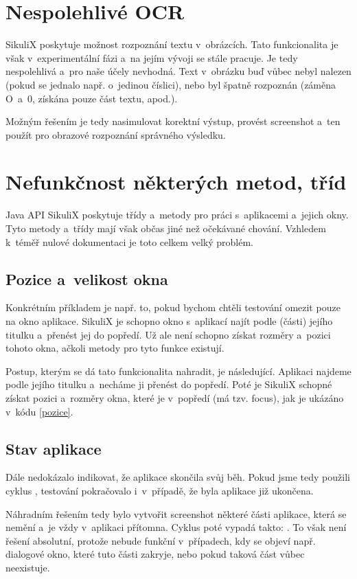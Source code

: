 	\section{Nespolehlivé OCR}
	SikuliX poskytuje možnost rozpoznání textu v~obrázcích. Tato funkcionalita je však v~experimentální fázi a~na jejím vývoji se stále pracuje. Je tedy nespolehlivá a~pro naše účely nevhodná. Text v~obrázku buď vůbec nebyl nalezen (pokud se jednalo např. o~jedinou číslici), nebo byl špatně rozpoznán (záměna O~a~0, získána pouze část textu, apod.).
	
	Možným řešením je tedy nasimulovat korektní výstup, provést screenshot a~ten použít pro obrazové rozpoznání správného výsledku.
	
	\section{Nefunkčnost některých metod, tříd}
	Java API SikuliX poskytuje třídy a~metody pro práci s~aplikacemi a~jejich okny. Tyto metody a~třídy mají však občas jiné než očekávané chování. Vzhledem k~téměř nulové dokumentaci je toto celkem velký problém.

		\subsection{Pozice a~velikost okna}		
		Konkrétním příkladem je např. to, pokud bychom chtěli testování omezit pouze na okno aplikace. SikuliX je schopno okno s~aplikací najít podle (části) jejího titulku a~přenést jej do popředí. Už ale není schopno získat rozměry a~pozici tohoto okna, ačkoli metody pro tyto funkce existují.
	
		Postup, kterým se dá tato funkcionalita nahradit, je následující. Aplikaci najdeme podle jejího titulku a~necháme ji přenést do popředí. Poté je SikuliX schopné získat pozici a~rozměry okna, které je v~popředí (má tzv. focus), jak je ukázáno v~kódu \ref{pozice}.
		
		
		\subsection{Stav aplikace}
		Dále nedokázalo indikovat, že aplikace skončila svůj běh. Pokud jsme tedy použili cyklus , testování pokračovalo i~v~případě, že byla aplikace již ukončena.
	
		Náhradním řešením tedy bylo vytvořit screenshot některé části aplikace, která se nemění a~je vždy v~aplikaci přítomna. Cyklus poté vypadá takto: . To však není řešení absolutní, protože nebude funkční v~případech, kdy se objeví např. dialogové okno, které tuto části zakryje, nebo pokud taková část vůbec neexistuje.
		
